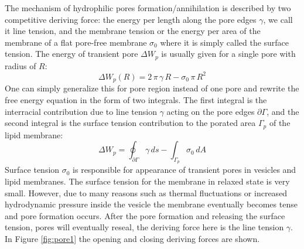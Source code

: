\documentclass[english,12pt]{article}
\begin{document}
The mechanism of hydrophilic pores formation/annihilation is described by two competitive deriving force: the energy per length along the pore edges $\gamma$, we call it line tension, and the membrane tension or the energy per area of the membrane of a flat pore-free membrane $\sigma_0$ where it is simply called the surface tension. The energy of transient pore $\Delta W_{p}$ is usually given for a single pore with radius of $R$:
\begin{equation}
	\Delta W_{p}(R)=2\,\pi\,\gamma\,R-\sigma_0\,\pi\,R^2
\end{equation}
One can simply generalize this for pore region instead of one pore and rewrite the free energy equation in the form of two integrals. The first integral is the interracial contribution due to line tension $\gamma$ acting on the pore edges $\partial\Gamma$, and the second integral is the surface tension contribution to the porated area $\Gamma_p$ of the lipid membrane:
\begin{equation}
	\Delta W_{p} = \oint_{\partial\Gamma}\gamma\,ds - \int_{\Gamma_p}\sigma_0\,dA
	\label{eqn:transientmodel}
\end{equation}
Surface tension $\sigma_0$ is responsible for appearance of transient pores in vesicles and lipid membranes. The surface tension for the membrane in relaxed state is very small. However, due to many reasons such as thermal fluctuations or increased hydrodynamic pressure inside the vesicle the membrane eventually becomes tense and pore formation occurs. After the pore formation and releasing the surface tension, pores will eventually reseal, the deriving force here is the line tension $\gamma$. In Figure \ref{fig:pore1} the opening and closing deriving forces are shown.
\end{document}
